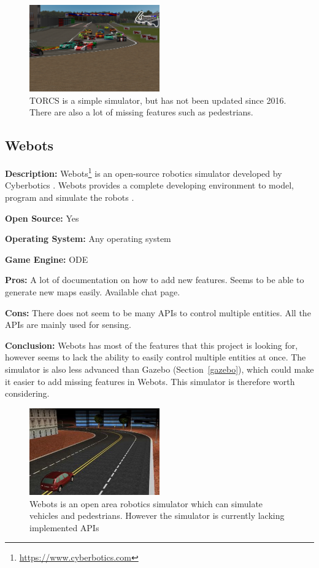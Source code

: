 \begin{figure}[H]
    \centering
    \includegraphics[width=0.5\textwidth]{03_Background/Appendix/Simulators/TORCS.png}
    \caption{TORCS is a simple simulator, but has not been updated since 2016. There are also a lot of missing features such as pedestrians.}
\end{figure}

\subsection{Webots}
\textbf{Description:} Webots\footnote{\url{https://www.cyberbotics.com}} is an open-source robotics simulator developed by Cyberbotics \cite{Webots_Github}. Webots provides a complete developing environment to model, program and simulate the robots \cite{Webots_home}. 

\textbf{Open Source:} Yes

\textbf{Operating System:} Any operating system

\textbf{Game Engine:} ODE

\textbf{Pros:} A lot of documentation on how to add new features. Seems to be able to generate new maps easily. Available chat page.

\textbf{Cons:} There does not seem to be many APIs to control multiple entities. All the APIs are mainly used for sensing. 

\textbf{Conclusion:} Webots has most of the features that this project is looking for, however seems to lack the ability to easily control multiple entities at once. The simulator is also less advanced than Gazebo (Section~\ref{gazebo}), which could make it easier to add missing features in Webots. This simulator is therefore worth considering.

\begin{figure}[H]
    \centering
    \includegraphics[width=0.5\textwidth]{03_Background/Appendix/Simulators/Webots.jpg}
    \caption{Webots is an open area robotics simulator which can simulate vehicles and pedestrians. However the simulator is currently lacking implemented APIs}
\end{figure}

